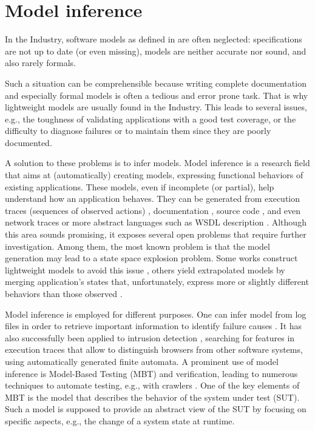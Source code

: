\section{Model inference}
\label{sec:related:modelinf}

In the Industry, software models as defined in
 are
often neglected: specifications are not up to date (or even
missing), models are neither accurate nor sound, and also rarely
formals.

Such a situation can be comprehensible because writing complete
documentation and especially formal models is often a tedious and
error prone task. That is why lightweight models are usually
found in the Industry. This leads to several issues, e.g., the
toughness of validating applications with a good test coverage,
or the difficulty to diagnose failures or to maintain them since
they are poorly documented.

A solution to these problems is to infer models. Model
inference is a research field that aims at (automatically)
creating models, expressing functional behaviors of existing
applications.  These models, even if incomplete (or partial),
help understand how an application behaves. They can be generated
from execution traces (sequences of observed actions)
\cite{Krka:2010:UDE:1810295.1810324}, documentation
\cite{ZhongZXM11}, source code
\cite{Salah05scenariographer,Pradel:2009}, and even network
traces \cite{6079839} or more abstract languages such as WSDL
description \cite{Bertolino:2009:ASB:1595696.1595719}. Although
this area sounds promising, it exposes several open problems that
require further investigation. Among them, the most known problem
is that the model generation may lead to a state space explosion
problem. Some works construct lightweight models to avoid this
issue \cite{WPX13}, others yield extrapolated models by merging
application's states that, unfortunately, express more or
slightly different behaviors than those observed \cite{4023976}.

Model inference is employed for different purposes. One can infer
model from log files in order to retrieve important information
to identify failure causes \cite{4700316}. It has also
successfully been applied to intrusion detection \cite{debar00},
searching for features in execution traces that allow to
distinguish browsers from other software systems, using
automatically generated finite automata.
A prominent use of model inference is Model-Based Testing (MBT)
and verification, leading to numerous techniques to automate
testing, e.g., with crawlers
\cite{Amalfitano:2012:UGR:2351676.2351717,Joorabchi:2012:REI:2420240.2420457,MobiGUITARIEEESoftware2014}.
One of the key elements of MBT is the model that describes the
behavior of the system under test (SUT). Such a model is supposed
to provide an abstract view of the SUT by focusing on specific
aspects, e.g., the change of a system state at runtime.

